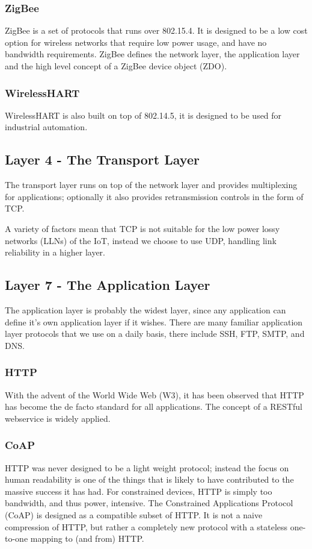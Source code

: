 \documentclass[11pt,journal,compsoc]{IEEEtran}
\begin{document}
\subsubsection{ZigBee}
ZigBee is a set of protocols that runs over 802.15.4. It is designed to be a
low cost option for wireless networks that require low power usage, and have no
bandwidth requirements. ZigBee defines the network layer, the application layer
and the high level concept of a ZigBee device object (ZDO). 

\subsubsection{WirelessHART}
WirelessHART is also built on top of 802.14.5, it is designed to be used for
industrial automation. 

\subsection{Layer 4 - The Transport Layer}
The transport layer runs on top of the network layer and provides multiplexing
for applications; optionally it also provides retransmission controls in
the form of TCP. 

A variety of factors mean that TCP is not suitable for the low power lossy
networks (LLNs) of the IoT, instead we choose to use UDP, handling link
reliability in a higher layer.

\subsection{Layer 7 - The Application Layer}
The application layer is probably the widest layer, since any application can
define it's own application layer if it wishes. There are many familiar
application layer protocols that we use on a daily basis, there include SSH,
FTP, SMTP, and DNS. 

\subsubsection{HTTP} 
With the advent of the World Wide Web (W3), it has been observed that HTTP has
become the de facto standard for all applications. The concept of a RESTful
webservice is widely applied.  

\subsubsection{CoAP}
HTTP was never designed to be a light weight protocol; instead the focus on
human readability is one of the things that is likely to have contributed to
the massive success it has had. For constrained devices, HTTP is simply too
bandwidth, and thus power, intensive. The Constrained Applications Protocol
(CoAP) is designed as a compatible subset of HTTP. It is not a naive
compression of HTTP, but rather a completely new protocol with a stateless
one-to-one mapping to (and from) HTTP. 
\end{document}
